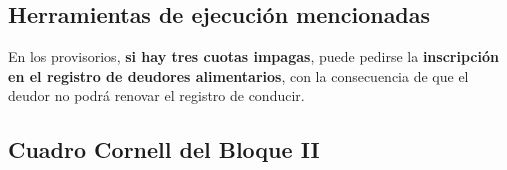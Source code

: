 \documentclass[12pt,oneside]{book}
\begin{document}

\subsection{Herramientas de ejecución mencionadas}

En los provisorios, \textbf{si hay tres cuotas impagas}, puede pedirse la \textbf{inscripción en el registro de deudores alimentarios}, con la consecuencia de que el deudor no podrá renovar el registro de conducir.

\subsection*{Cuadro Cornell del Bloque II}
\end{document}
